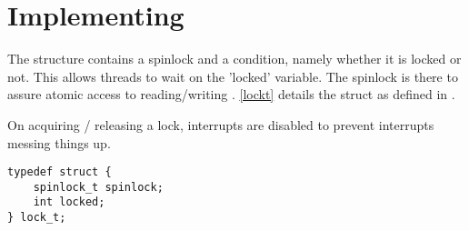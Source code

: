 \section{Implementing }

The  structure contains a spinlock and a condition,
namely whether it is locked or not. This allows threads to wait on
the 'locked' variable. The spinlock is there to assure atomic access
to reading/writing . \autoref{lockt} details the struct
as defined in .

On acquiring / releasing a lock, interrupts are disabled to prevent
interrupts messing things up.

\begin{lstlisting}
typedef struct {
	spinlock_t spinlock;
	int locked;
} lock_t;
\end{lstlisting}

\FloatBarrier %

